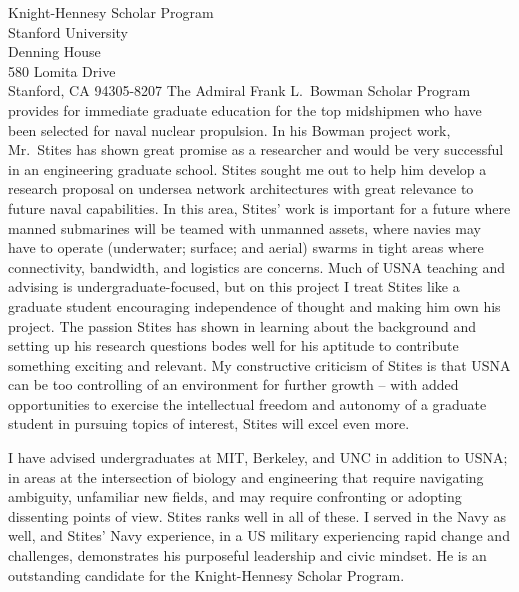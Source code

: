 \documentclass[10pt]{wrceletter}
\begin{document}
\begin{letter}{%
Knight-Hennesy Scholar Program\\
Stanford University\\
Denning House\\
580 Lomita Drive\\
Stanford, CA 94305-8207}
The Admiral Frank L.~Bowman Scholar Program provides for immediate graduate education for the top midshipmen who have been selected for naval nuclear propulsion. In his Bowman project work, Mr.~Stites has shown great promise as a researcher and would be very successful in an engineering graduate school. Stites sought me out to help him develop a research proposal on undersea network architectures with great relevance to future naval capabilities. In this area, Stites' work is important for a future where manned submarines will be teamed with unmanned assets, where navies may have to operate (underwater; surface; and aerial) swarms in tight areas where connectivity, bandwidth, and logistics are concerns. Much of USNA teaching and advising is undergraduate-focused, but on this project I treat Stites like a graduate student encouraging independence of thought and making him own his project. The passion Stites has shown in learning about the background and setting up his research questions bodes well for his aptitude to contribute something exciting and relevant. My constructive criticism of Stites is that USNA can be too controlling of an environment for further growth -- with added opportunities to exercise the intellectual freedom and autonomy of a graduate student in pursuing topics of interest, Stites will excel even more.

I have advised undergraduates at MIT, Berkeley, and UNC in addition to USNA; in areas at the intersection of biology and engineering that require navigating ambiguity, unfamiliar new fields, and may require confronting or adopting dissenting points of view. Stites ranks well in all of these. I served in the Navy as well, and Stites' Navy experience, in a US military experiencing rapid change and challenges, demonstrates his purposeful leadership and civic mindset. He is an outstanding candidate for the Knight-Hennesy Scholar Program.

\closing{~} %

\end{letter}
\end{document}
